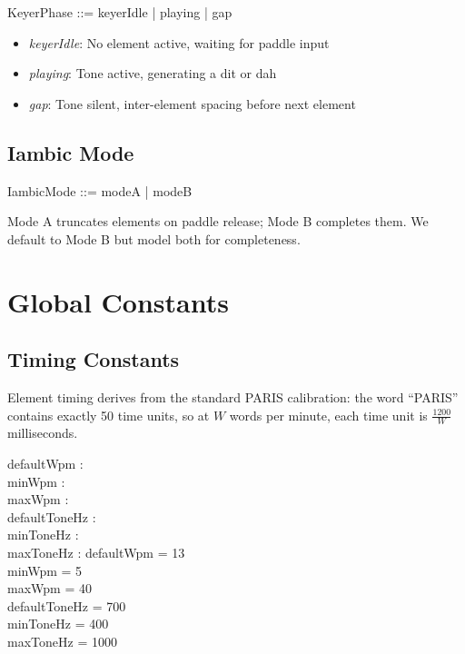 \documentclass[a4paper,10pt,fleqn]{article}
\begin{document}
\begin{zed}
KeyerPhase ::= keyerIdle | playing | gap
\end{zed}

\begin{itemize}
\item \emph{keyerIdle}: No element active, waiting for paddle input
\item \emph{playing}: Tone active, generating a dit or dah
\item \emph{gap}: Tone silent, inter-element spacing before next element
\end{itemize}

\subsection{Iambic Mode}

\begin{zed}
IambicMode ::= modeA | modeB
\end{zed}

Mode A truncates elements on paddle release; Mode B completes them. We default
to Mode B but model both for completeness.

\section{Global Constants}

\subsection{Timing Constants}

Element timing derives from the standard PARIS calibration: the word ``PARIS''
contains exactly 50 time units, so at $W$ words per minute, each time unit
is $\frac{1200}{W}$ milliseconds.

\begin{axdef}
defaultWpm : \nat \\
minWpm : \nat \\
maxWpm : \nat \\
defaultToneHz : \nat \\
minToneHz : \nat \\
maxToneHz : \nat
\where
defaultWpm = 13 \\
minWpm = 5 \\
maxWpm = 40 \\
defaultToneHz = 700 \\
minToneHz = 400 \\
maxToneHz = 1000
\end{axdef}
\end{document}
